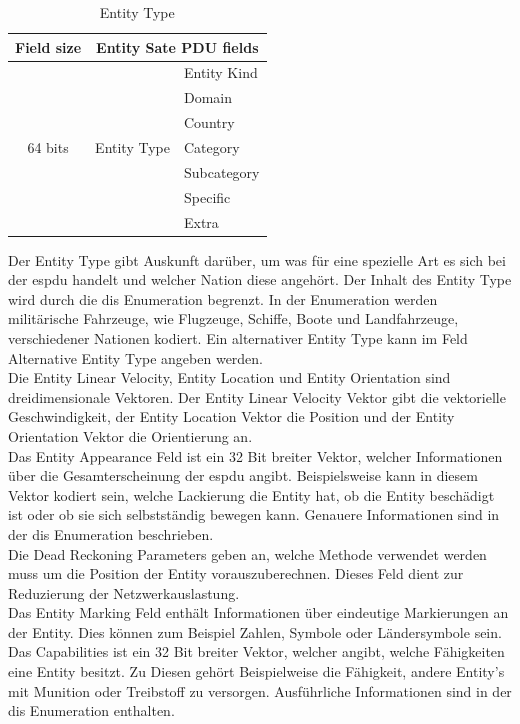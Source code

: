 \begin{table}[H]
	\centering
	\begin{tabular}{|c|c|l|}
		\hline
		Field size               & \multicolumn{2}{c|}{Entity Sate PDU fields} \\ \hline
		\multirow{7}{*}{64 bits} & \multirow{7}{*}{Entity Type}  & Entity Kind \\ \cline{3-3} 
		&                               & Domain      \\ \cline{3-3} 
		&                               & Country     \\ \cline{3-3} 
		&                               & Category    \\ \cline{3-3} 
		&                               & Subcategory \\ \cline{3-3} 
		&                               & Specific    \\ \cline{3-3} 
		&                               & Extra       \\ \hline
	\end{tabular}
\caption[Entity Type ]{Entity Type\cite{SISOStandardsActivityCommitteeoftheIEEEComputerSociety.}}
\label{type}

\end{table}
Der Entity Type gibt Auskunft darüber, um was für eine spezielle Art es sich bei der \ac{espdu} handelt und welcher Nation diese angehört. Der Inhalt des Entity Type wird durch die \ac{dis} Enumeration begrenzt. In der Enumeration werden militärische Fahrzeuge, wie Flugzeuge, Schiffe, Boote und Landfahrzeuge, verschiedener Nationen kodiert. Ein alternativer Entity Type kann im Feld \glqq Alternative Entity Type\grqq{} angeben werden.\\
Die  \glqq Entity Linear Velocity\grqq{}, \glqq Entity Location\grqq{} und \glqq Entity Orientation \grqq{} sind  dreidimensionale Vektoren. Der  \glqq Entity Linear Velocity\grqq{} Vektor gibt die vektorielle Geschwindigkeit, der \glqq Entity Location\grqq{} Vektor die Position und der \glqq Entity Orientation\grqq{} Vektor die Orientierung an. \\
Das  \glqq Entity Appearance\grqq{} Feld ist ein 32 Bit breiter Vektor, welcher Informationen über die Gesamterscheinung der \ac{espdu} angibt. Beispielsweise kann in diesem Vektor kodiert sein, welche Lackierung die Entity hat, ob die Entity beschädigt ist oder ob sie sich selbstständig bewegen kann. Genauere Informationen sind in der \ac{dis} Enumeration beschrieben.\\
 Die  \glqq Dead Reckoning Parameters\grqq{}  geben an, welche Methode verwendet werden muss um die Position der Entity vorauszuberechnen. Dieses Feld dient zur Reduzierung der Netzwerkauslastung.\\
 Das \glqq Entity Marking\grqq{} Feld enthält Informationen über eindeutige Markierungen an der Entity. Dies können zum Beispiel Zahlen, Symbole oder Ländersymbole sein.\\ Das \glqq Capabilities\grqq{} ist ein 32 Bit breiter Vektor, welcher angibt, welche Fähigkeiten eine Entity besitzt. Zu Diesen  gehört Beispielweise die 
Fähigkeit, andere Entity's mit Munition oder Treibstoff zu versorgen. Ausführliche Informationen sind in der \ac{dis} Enumeration enthalten.

